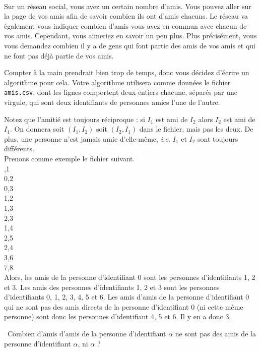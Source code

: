 \exer{[FIC-000]}
\setcounter{numques}{0}~\\

Sur un réseau social, vous avez un certain nombre d'amis. Vous pouvez aller sur la page de vos amis afin de savoir combien ils 
ont d'amis chacuns. Le réseau va également vous indiquer combien d'amis vous avez en commun avec chacun de vos amis. 
Cependant, vous aimeriez en savoir un peu plus. Plus précisément, vous vous demandez combien il y a de gens qui font 
partie des amis de vos amis et qui ne font pas déjà partie de vos amis. 

Compter à la main prendrait bien trop de temps, donc vous décidez d'écrire un algorithme pour cela. 
Votre algorithme utilisera comme données le fichier \texttt{amis.csv}, dont les lignes comportent deux entiers chacune, séparés par une  virgule, qui sont deux identifiants de personnes amies l'une de l'autre.


Notez que l'amitié est toujours réciproque : si $I_1$ est ami de $I_2$ alors $I_2$ est ami de $I_1$. On donnera soit 
$(I_1,I_2)$ soit $(I_2,I_1)$ dans le fichier, mais pas les deux.
De plus, une personne n'est jamais amie d'elle-même, \emph{i.e.} $I_1$ et $I_2$ sont toujours différents. \\

Prenons comme exemple le fichier suivant.\\

,1\\
0,2\\
0,3\\
1,2\\
1,3\\
2,3\\
1,4\\
2,5\\
2,4\\
3,6\\
7,8\\

Alors, les amis de la personne d'identifiant $0$ sont les personnes d'identifiants 1, 2 et 3. Les amis des personnes d'identifiants 1, 2 et 3 sont les personnes d'identifiants 0, 1, 2, 3, 4, 5 et 6. 
Les amis d'amis de la personne d'identifiant 0 qui ne sont pas des amis directs de la personne 
d'identifiant 0 (ni cette même personne) sont donc les personnes d'identifiant 4, 5 et 6. Il y en a donc 3.

\medskip

\question\ Combien d'amis d'amis de la personne d'identifiant $\alpha$ ne sont pas des amis de la personne d'identifiant $\alpha$, ni $\alpha$ ?